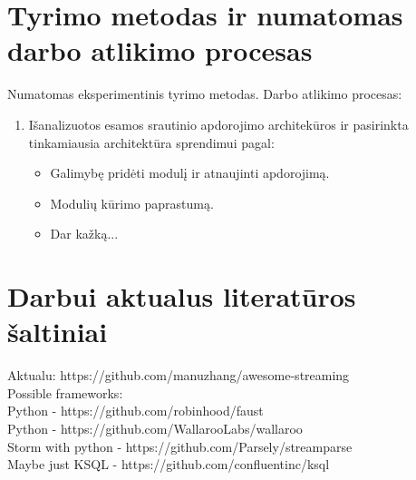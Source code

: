 \documentclass{VUMIFPSbakalaurinis}
\begin{document}
\section{Tyrimo metodas ir numatomas darbo atlikimo procesas}
Numatomas eksperimentinis tyrimo metodas.
Darbo atlikimo procesas:
\begin{enumerate}
    \item Išanalizuotos esamos srautinio apdorojimo architekūros ir pasirinkta tinkamiausia architektūra sprendimui pagal:
    	\begin{itemize}
		\item Galimybę pridėti modulį ir atnaujinti apdorojimą.
		\item Modulių kūrimo paprastumą.
		\item Dar kažką...
	\end{itemize}
\end{enumerate}

\section{Darbui aktualus literatūros šaltiniai}
Aktualu: https://github.com/manuzhang/awesome-streaming \\
Possible frameworks: \\
 Python - https://github.com/robinhood/faust \\
 Python - https://github.com/WallarooLabs/wallaroo \\
 Storm with python - https://github.com/Parsely/streamparse \\
 Maybe just KSQL - https://github.com/confluentinc/ksql \\
 
\end{document}
